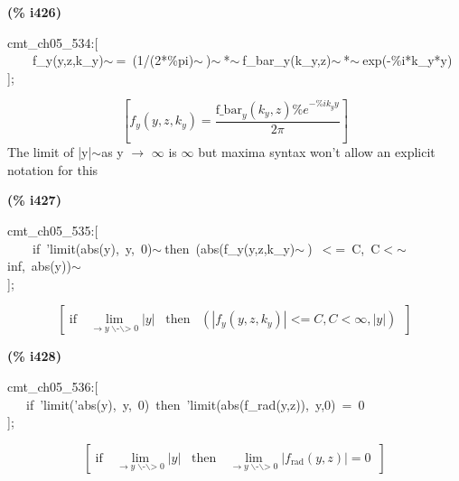 \documentclass[fleqn]{article}
\begin{document}
\noindent
\begin{minipage}[t]{4.000000em}\color{red}\bfseries
(\% i426)	
\end{minipage}
\begin{minipage}[t]{\textwidth}\color{blue}
cmt\_ch05\_534:[\\
\ \ \ \ f\_y(y,z,k\_y)\ensuremath{\sim\ }=\ (1/(2*\%pi)\ensuremath{\sim\ })\ensuremath{\sim\ }*\ensuremath{\sim\ }f\_bar\_y(k\_y,z)\ensuremath{\sim\ }*\ensuremath{\sim\ }exp(-\%i*k\_y*y)\\
];
\end{minipage}
\[\displaystyle \tag{\% o426} 
\left[ {f_y}\left( y\operatorname{,}z\operatorname{,}{k_y}\right) =\frac{{{\ensuremath{\mathrm{f\_ bar}}}_y}\left( {k_y}\operatorname{,}z\right)  {{\% e}^{-\% i {k_y} y}}}{2 \ensuremath{\pi} }\right] \mbox{}
\]
The limit of |y|\ensuremath{\sim }as y \ensuremath{\longrightarrow} \ensuremath{\infty} is \ensuremath{\infty} but maxima syntax won't allow an explicit notation for this


\noindent
\begin{minipage}[t]{4.000000em}\color{red}\bfseries
(\% i427)	
\end{minipage}
\begin{minipage}[t]{\textwidth}\color{blue}
cmt\_ch05\_535:[\\
\ \ \ \ if\ 'limit(abs(y),\ y,\ 0)\ensuremath{\sim\ }then\ (abs(f\_y(y,z,k\_y)\ensuremath{\sim\ })\ \ensuremath{<}=\ C,\ C\ensuremath{<}\ensuremath{\sim\ }inf,\ abs(y))\ensuremath{\sim\ }\\
];
\end{minipage}
\[\displaystyle \tag{\% o427} 
\left[ \operatorname{if}\operatorname{ }\lim_{\to y\operatorname{\backslash -\backslash >  }0}{\left| y\right| }\operatorname{ }\operatorname{then}\operatorname{ }\left( \left| {f_y}\left( y\operatorname{,}z\operatorname{,}{k_y}\right) \right| \operatorname{<  =}C\operatorname{,}C\operatorname{<  }\infty \operatorname{,}\left| y\right| \right) \operatorname{ }\right] \mbox{}
\]


\noindent
\begin{minipage}[t]{4.000000em}\color{red}\bfseries
(\% i428)	
\end{minipage}
\begin{minipage}[t]{\textwidth}\color{blue}
cmt\_ch05\_536:[\\
\ \ \ if\ 'limit('abs(y),\ y,\ 0)\ then\ 'limit(abs(f\_rad(y,z)),\ y,0)\ =\ 0\\
];
\end{minipage}
\[\displaystyle \tag{\% o428} 
\left[ \operatorname{if}\operatorname{ }\lim_{\to y\operatorname{\backslash -\backslash >  }0}{\left| y\right| }\operatorname{ }\operatorname{then}\operatorname{ }\lim_{\to y\operatorname{\backslash -\backslash >  }0}{\left| {f_{\ensuremath{\mathrm{rad}}}}\left( y\operatorname{,}z\right) \right| }=0\operatorname{ }\right] \mbox{}
\]
\end{document}
